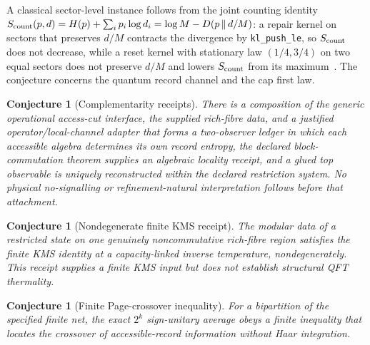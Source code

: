 \documentclass[11pt]{article}
\newtheorem{conjecture}[theorem]{Conjecture}
\theoremstyle{remark}
\newcommand{\KL}[2]{D\!\left(#1\,\middle\|\,#2\right)}
\begin{document}
A classical sector-level instance follows from the joint counting identity
\(S_{\rm count}(p,d)=H(p)+\sum_ip_i\log d_i=\log M-\KL{p}{d/M}\): a repair
kernel on sectors that preserves \(d/M\) contracts the divergence by
\texttt{kl\_push\_le}, so \(S_{\rm count}\) does not decrease, while a reset
kernel with stationary law \((1/4,3/4)\) on two equal sectors does not
preserve \(d/M\) and lowers \(S_{\rm count}\) from its maximum~\cite{ophentropy}.
The conjecture concerns the quantum record channel and the cap first law.

\begin{conjecture}[Complementarity receipts]
There is a composition of the generic operational access-cut interface, the
supplied rich-fibre data, and a justified operator/local-channel adapter
that forms a two-observer ledger in which each accessible algebra determines its own
record entropy, the declared block-commutation theorem supplies an algebraic
locality receipt, and a glued top observable is uniquely reconstructed within
the declared restriction system. No physical no-signalling or
refinement-natural interpretation follows before that attachment.
\end{conjecture}

\begin{conjecture}[Nondegenerate finite KMS receipt]
\label{tgt:kms}
The modular data of a restricted state on one genuinely noncommutative
rich-fibre region satisfies the finite KMS identity at a capacity-linked
inverse temperature, nondegenerately. This receipt supplies a finite KMS
input but does not establish structural QFT thermality.
\end{conjecture}

\begin{conjecture}[Finite Page-crossover inequality]
For a bipartition of the specified finite net, the exact $2^{k}$ sign-unitary
average obeys a finite inequality that locates the crossover of
accessible-record information without Haar integration.
\end{conjecture}
\end{document}
